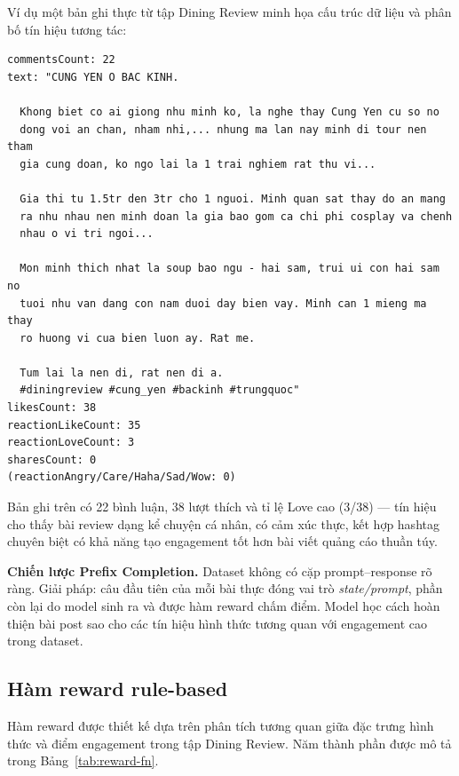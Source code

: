 Ví dụ một bản ghi thực từ tập Dining Review minh họa cấu trúc dữ liệu
và phân bố tín hiệu tương tác:

\begin{lstlisting}[language={},basicstyle=\scriptsize\ttfamily,
  breaklines=true,frame=single,numbers=none,
  caption={Ví dụ một dòng trong tập Dining Review (CSV, rút gọn).}]
commentsCount: 22
text: "CUNG YEN O BAC KINH.

  Khong biet co ai giong nhu minh ko, la nghe thay Cung Yen cu so no
  dong voi an chan, nham nhi,... nhung ma lan nay minh di tour nen tham
  gia cung doan, ko ngo lai la 1 trai nghiem rat thu vi...

  Gia thi tu 1.5tr den 3tr cho 1 nguoi. Minh quan sat thay do an mang
  ra nhu nhau nen minh doan la gia bao gom ca chi phi cosplay va chenh
  nhau o vi tri ngoi...

  Mon minh thich nhat la soup bao ngu - hai sam, trui ui con hai sam no
  tuoi nhu van dang con nam duoi day bien vay. Minh can 1 mieng ma thay
  ro huong vi cua bien luon ay. Rat me.

  Tum lai la nen di, rat nen di a.
  #diningreview #cung_yen #backinh #trungquoc"
likesCount: 38
reactionLikeCount: 35
reactionLoveCount: 3
sharesCount: 0
(reactionAngry/Care/Haha/Sad/Wow: 0)
\end{lstlisting}

Bản ghi trên có 22 bình luận, 38 lượt thích và tỉ lệ Love cao (3/38)
--- tín hiệu cho thấy bài review dạng kể chuyện cá nhân, có cảm xúc
thực, kết hợp hashtag chuyên biệt có khả năng tạo engagement tốt hơn
bài viết quảng cáo thuần túy.

\textbf{Chiến lược Prefix Completion.} Dataset không có cặp
prompt--response rõ ràng. Giải pháp: câu đầu tiên của mỗi bài thực
đóng vai trò \emph{state/prompt}, phần còn lại do model sinh ra và
được hàm reward chấm điểm. Model học cách hoàn thiện bài post sao
cho các tín hiệu hình thức tương quan với engagement cao trong dataset.

\subsection{Hàm reward rule-based}

Hàm reward được thiết kế dựa trên phân tích tương quan giữa đặc trưng
hình thức và điểm engagement trong tập Dining Review. Năm thành phần
được mô tả trong Bảng~\ref{tab:reward-fn}.

